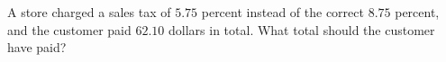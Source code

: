 A store charged a sales tax of $5.75$ percent instead of the correct $8.75$ percent, and the customer paid $62.10$ dollars in total. What total should the customer have paid?
